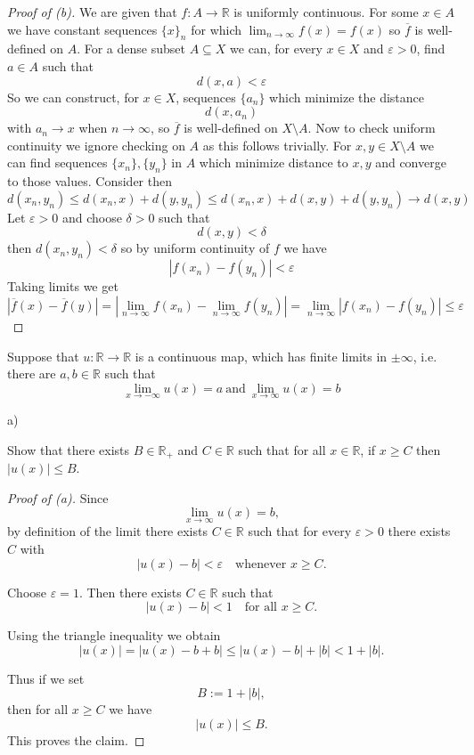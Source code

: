 \begin{proof}[Proof of (b)]
    We are given that $f : A \to \mathbb R$ is uniformly continuous.
    For some $x \in A$ we have constant sequences $\{x\}_n$ for 
    which $\lim_{n\to\infty}f(x) = f(x)$ so $\overline f$ is 
    well-defined on $A$.
    For a dense subset $A \subseteq X$ we can, for every 
    $x \in X$ and $\varepsilon > 0$, find $a \in A$ such that 
    \[
        d(x,a) < \varepsilon
    \]
    So we can construct, for $x \in X$, sequences $\{a_n\}$ which 
    minimize the distance 
    \[
        d(x,a_n)
    \]
    with $a_n \to x$ when $n\to\infty$, so $\overline f$ is 
    well-defined on $X \setminus A$. Now to check uniform continuity  
    we ignore checking on $A$ as this follows trivially. 
    For $x,y \in X \setminus A$ we can find sequences 
    $\{x_n\},\{y_n\}$ in $A$ which minimize distance to $x,y$ and 
    converge to those values. Consider then 
    \[
        d(x_n,y_n) \leq d(x_n, x) + d(y,y_n) \leq 
        d(x_n, x) + d(x,y) + d(y,y_n) \to d(x,y) 
    \]
    Let $\varepsilon > 0$ and choose $\delta > 0$ such that 
    \[
        d(x,y) < \delta  
    \]
    then $d(x_n,y_n) < \delta$ so by uniform continuity of $f$ we 
    have 
    \[
        |f(x_n) - f(y_n)| < \varepsilon
    \]
    Taking limits we get  
    \[
        \left|\overline f(x) - \overline f(y)\right| = 
        \left|\lim_{n\to\infty}f(x_n) - \lim_{n\to\infty}f(y_n)\right|
        = \lim_{n\to\infty}\left|f(x_n) - f(y_n)\right| 
        \leq \varepsilon
    \]
\end{proof}
\begin{prob}
    Suppose that $u:\mathbb R \to \mathbb R$ is a continuous map, 
    which has finite limits in $\pm \infty$, i.e. 
    there are $a,b \in \mathbb R$ such that 
    \[
        \lim_{x\to-\infty}u(x) = a \ \text{and} \ 
        \lim_{x\to\infty}u(x) = b
    \]

    a) 

    Show that there exists $B \in \mathbb R_+$ and $C \in \mathbb R$
    such that for all $x \in \mathbb R$, if $x \geq C$ then 
    $|u(x)| \leq B$.
\end{prob}
\begin{proof}[Proof of (a)]
    Since 
    \[
        \lim_{x\to\infty} u(x) = b,
    \]
    by definition of the limit there exists $C \in \mathbb R$ 
    such that
    for every $\varepsilon > 0$ there exists $C$ with
    \[
        |u(x) - b| < \varepsilon
        \quad \text{whenever } x \ge C.
    \]

    Choose $\varepsilon = 1$. Then there exists $C \in \mathbb R$ 
    such that
    \[
        |u(x) - b| < 1 \quad \text{for all } x \ge C.
    \]

    Using the triangle inequality we obtain
    \[
        |u(x)| = |u(x) - b + b|
        \le |u(x) - b| + |b|
        < 1 + |b|.
    \]

    Thus if we set
    \[
        B := 1 + |b|,
    \]
    then for all $x \ge C$ we have
    \[
        |u(x)| \le B.
    \]
    This proves the claim.
\end{proof}

